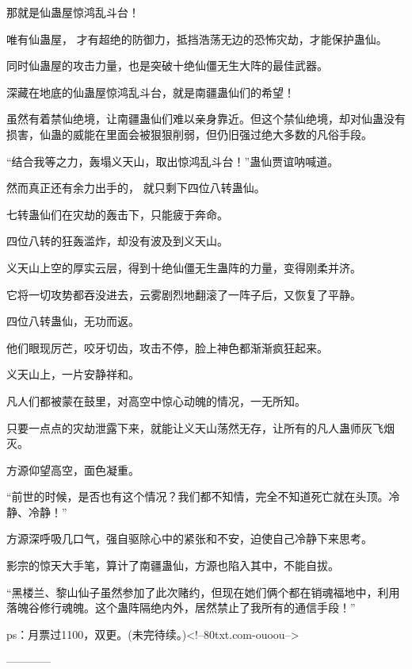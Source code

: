 \begin{this_body}
那就是仙蛊屋惊鸿乱斗台！

唯有仙蛊屋， 才有超绝的防御力，抵挡浩荡无边的恐怖灾劫，才能保护蛊仙。

同时仙蛊屋的攻击力量，也是突破十绝仙僵无生大阵的最佳武器。

深藏在地底的仙蛊屋惊鸿乱斗台，就是南疆蛊仙们的希望！

虽然有着禁仙绝境，让南疆蛊仙们难以亲身靠近。但这个禁仙绝境，却对仙蛊没有损害，仙蛊的威能在里面会被狠狠削弱，但仍旧强过绝大多数的凡俗手段。

“结合我等之力，轰塌义天山，取出惊鸿乱斗台！”蛊仙贾谊呐喊道。

然而真正还有余力出手的， 就只剩下四位八转蛊仙。

七转蛊仙们在灾劫的轰击下，只能疲于奔命。

四位八转的狂轰滥炸，却没有波及到义天山。

义天山上空的厚实云层，得到十绝仙僵无生蛊阵的力量，变得刚柔并济。

它将一切攻势都吞没进去，云雾剧烈地翻滚了一阵子后，又恢复了平静。

四位八转蛊仙，无功而返。

他们眼现厉芒，咬牙切齿，攻击不停，脸上神色都渐渐疯狂起来。

义天山上，一片安静祥和。

凡人们都被蒙在鼓里，对高空中惊心动魄的情况，一无所知。

只要一点点的灾劫泄露下来，就能让义天山荡然无存，让所有的凡人蛊师灰飞烟灭。

方源仰望高空，面色凝重。

“前世的时候，是否也有这个情况？我们都不知情，完全不知道死亡就在头顶。冷静、冷静！”

方源深呼吸几口气，强自驱除心中的紧张和不安，迫使自己冷静下来思考。

影宗的惊天大手笔，算计了南疆蛊仙，方源也陷入其中，不能自拔。

“黑楼兰、黎山仙子虽然参加了此次赌约，但现在她们俩个都在销魂福地中，利用落魄谷修行魂魄。这个蛊阵隔绝内外，居然禁止了我所有的通信手段！”

ps：月票过1100，双更。(未完待续。)<!--80txt.com-ouoou-->

------------

\end{this_body}

